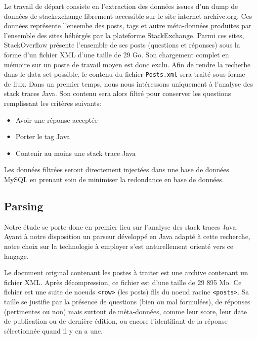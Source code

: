 \documentclass[11pt,a4paper]{article}
\begin{document}
Le travail de départ consiste en l'extraction des données issues d'un dump de données de stackexchange librement accessible sur le site internet archive.org\cite{so-dump}.
Ces données représente l'ensembe des posts, tags et autre méta-données produites par l'ensemble des sites hébérgés par la plateforme StackExchange\cite{se}.
Parmi ces sites, StackOverflow présente l'ensemble de ses posts (questions et réponses) sous la forme d'un fichier XML d'une taille de 29 Go.
Son chargement complet en mémoire sur un poste de travail moyen est donc exclu.
Afin de rendre la recherhe dans le data set possible, le contenu du fichier \texttt{Posts.xml} sera traité sous forme de flux.
Dans un premier temps, nous nous intéressons uniquement à l'analyse des stack traces Java.
Son contenu sera alors filtré pour conserver les questions remplissant les critères suivants:
\newline

\begin{itemize}
	\item Avoir une réponse acceptée
	\item Porter le tag Java
	\item Contenir au moins une stack trace Java\newline
\end{itemize}

Les données filtrées seront directement injectées dans une base de données MySQL en prenant soin de minimiser la redondance en base de données.
\subsection{Parsing}

Notre étude se porte donc en premier lieu sur l'analyse des stack traces Java.
Ayant à notre disposition un parseur développé en Java adapté à cette recherche, notre choix sur la technologie à employer s'est naturellement orienté vers ce langage.
\newline

Le document original contenant les postes à traiter est une archive contenant un fichier XML.
Après décompression, ce fichier est d'une taille de 29 895 Mo.
Ce fichier est une suite de noeuds \texttt{<row>} (les posts) fils du noeud racine \texttt{<posts>}.
Sa taille se justifie par la présence de questions (bien ou mal formulées), de réponses (pertinentes ou non) mais surtout de méta-données, comme leur score, leur date de publication ou de dernière édition, ou encore l'identifiant de la réponse sélectionnée quand il y en a une.
\newline
\end{document}
